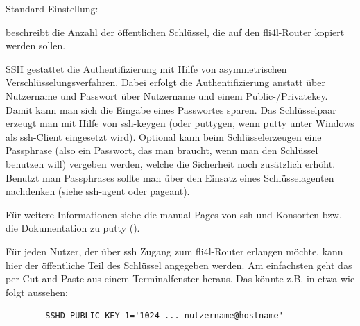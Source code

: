 \begin{description}

  Standard-Einstellung: 

   beschreibt die Anzahl der
  öffentlichen Schlüssel, die auf den fli4l-Router kopiert werden
  sollen.

  SSH gestattet die Authentifizierung mit Hilfe von asymmetrischen
  Verschlüsselungsverfahren. Dabei erfolgt die Authentifizierung
  anstatt über Nutzername und Passwort über Nutzername und einem
  Public-/Privatekey.  Damit kann man sich die Eingabe eines
  Passwortes sparen.  Das Schlüsselpaar erzeugt man mit Hilfe von
  ssh-keygen (oder puttygen, wenn putty unter Windows als ssh-Client
  eingesetzt wird). Optional kann beim Schlüsselerzeugen eine
  Passphrase (also ein Passwort, das man braucht, wenn man
  den Schlüssel benutzen will) vergeben werden, welche die Sicherheit noch
  zusätzlich erhöht. Benutzt man Passphrases sollte man über den
  Einsatz eines Schlüsselagenten nachdenken (siehe ssh-agent oder
  pageant).


  Für weitere Informationen siehe die manual Pages von ssh und
  Konsorten bzw. die Dokumentation zu putty
  ().


  Für jeden Nutzer, der über ssh Zugang zum fli4l-Router erlangen möchte,
  kann hier der öffentliche Teil des Schlüssel angegeben werden.  Am
  einfachsten geht das per Cut-and-Paste aus einem Terminalfenster
  heraus. Das könnte z.B. in etwa wie folgt aussehen:

\begin{example}
\begin{verbatim}
        SSHD_PUBLIC_KEY_1='1024 ... nutzername@hostname'
\end{verbatim}
\end{example}



\end{description}
